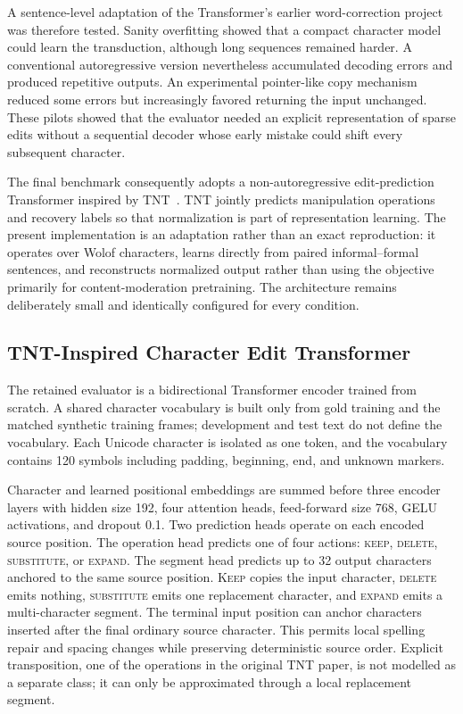 \documentclass[12pt, a4paper, twoside, openany]{report}
\begin{document}
A sentence-level adaptation of the Transformer's earlier word-correction project was therefore tested. Sanity overfitting showed that a compact character model could learn the transduction, although long sequences remained harder. A conventional autoregressive version nevertheless accumulated decoding errors and produced repetitive outputs. An experimental pointer-like copy mechanism reduced some errors but increasingly favored returning the input unchanged. These pilots showed that the evaluator needed an explicit representation of sparse edits without a sequential decoder whose early mistake could shift every subsequent character.

The final benchmark consequently adopts a non-autoregressive edit-prediction Transformer inspired by TNT~\cite{tan2020tnt}. TNT jointly predicts manipulation operations and recovery labels so that normalization is part of representation learning. The present implementation is an adaptation rather than an exact reproduction: it operates over Wolof characters, learns directly from paired informal--formal sentences, and reconstructs normalized output rather than using the objective primarily for content-moderation pretraining. The architecture remains deliberately small and identically configured for every condition.


\subsection{TNT-Inspired Character Edit Transformer}

The retained evaluator is a bidirectional Transformer encoder trained from scratch. A shared character vocabulary is built only from gold training and the matched synthetic training frames; development and test text do not define the vocabulary. Each Unicode character is isolated as one token, and the vocabulary contains 120 symbols including padding, beginning, end, and unknown markers.

Character and learned positional embeddings are summed before three encoder layers with hidden size 192, four attention heads, feed-forward size 768, GELU activations, and dropout 0.1. Two prediction heads operate on each encoded source position. The operation head predicts one of four actions: \textsc{keep}, \textsc{delete}, \textsc{substitute}, or \textsc{expand}. The segment head predicts up to 32 output characters anchored to the same source position. \textsc{Keep} copies the input character, \textsc{delete} emits nothing, \textsc{substitute} emits one replacement character, and \textsc{expand} emits a multi-character segment. The terminal input position can anchor characters inserted after the final ordinary source character. This permits local spelling repair and spacing changes while preserving deterministic source order. Explicit transposition, one of the operations in the original TNT paper, is not modelled as a separate class; it can only be approximated through a local replacement segment.
\end{document}
